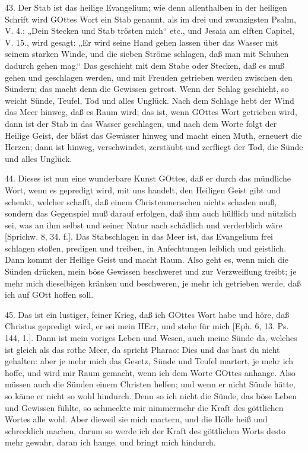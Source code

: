 43. Der Stab ist das heilige Evangelium; wie denn allenthalben in der heiligen Schrift wird GOttes Wort ein Stab genannt, als im drei und zwanzigsten Psalm, V. 4.: „Dein Stecken und Stab trösten mich“ etc., und Jesaia am elften Capitel, V. 15., wird gesagt: „Er wird seine Hand gehen lassen über das Wasser mit seinem starken Winde, und die sieben Ströme schlagen, daß man mit Schuhen dadurch gehen mag.“ Das geschieht mit dem Stabe oder Stecken, daß es muß gehen und geschlagen werden, und mit Freuden getrieben werden zwischen den Sündern; das macht denn die Gewissen getrost. Wenn der Schlag geschieht, so weicht Sünde, Teufel, Tod und alles Unglück. Nach dem Schlage hebt der Wind das Meer hinweg, daß es Raum wird; das ist, wenn GOttes Wort getrieben wird, dann ist der Stab in das Wasser geschlagen, und nach dem Worte folgt der Heilige Geist, der bläst das Gewässer hinweg und macht einen Muth, erneuert die Herzen; dann ist hinweg, verschwindet, zerstäubt und zerfliegt der Tod, die Sünde und alles Unglück.

44. Dieses ist nun eine wunderbare Kunst GOttes, daß er durch das mündliche Wort, wenn es gepredigt wird, mit uns handelt, den Heiligen Geist gibt und schenkt, welcher schafft, daß einem Christenmenschen nichts schaden muß, sondern das Gegenspiel muß darauf erfolgen, daß ihm auch hülflich und nützlich sei, was an ihm selbst und seiner Natur nach schädlich und verderblich wäre [Sprichw. 8, 34. f.]. Das Stabschlagen in das Meer ist, das Evangelium frei schlagen stoßen, predigen und treiben, in Anfechtungen leiblich und geistlich. Dann kommt der Heilige Geist und macht Raum. Also geht es, wenn mich die Sünden drücken, mein böse Gewissen beschweret und zur Verzweiflung treibt; je mehr mich dieselbigen kränken und beschweren, je mehr ich getrieben werde, daß ich auf GOtt hoffen soll.

45. Das ist ein lustiger, feiner Krieg, daß ich GOttes Wort habe und höre, daß Christus gepredigt wird, er sei mein HErr, und stehe für mich [Eph. 6, 13. Ps. 144, 1.]. Dann ist mein voriges Leben und Wesen, auch meine Sünde da, welches ist gleich als das rothe Meer, da spricht Pharao: Dies und das hast du nicht gehalten: aber je mehr mich das Gesetz, Sünde und Teufel martert, je mehr ich hoffe, und wird mir Raum gemacht, wenn ich dem Worte GOttes anhange. Also müssen auch die Sünden einem Christen helfen; und wenn er nicht Sünde hätte, so käme er nicht so wohl hindurch. Denn so ich nicht die Sünde, das böse Leben und Gewissen fühlte, so schmeckte mir nimmermehr die Kraft des göttlichen Wortes alle wohl. Aber dieweil sie mich martern, und die Hölle heiß und schrecklich machen, darum so werde ich der Kraft des göttlichen Worts desto mehr gewahr, daran ich hange, und bringt mich hindurch.


